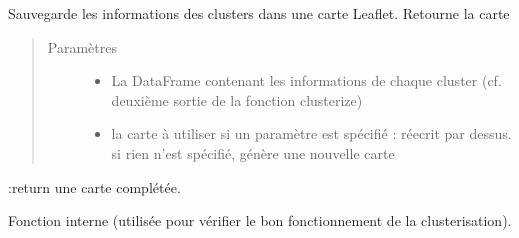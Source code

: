 \documentclass[letterpaper,10pt,french]{sphinxmanual}
\begin{document}
\begin{fulllineitems}
\label{\detokenize{index:src.clusterizer.clusterizer.save_to_map}}
\sphinxAtStartPar
Sauvegarde les informations des clusters dans une carte Leaflet.
Retourne la carte
\begin{quote}\begin{description}
\item[{Paramètres}] \leavevmode\begin{itemize}
\item {} 
\sphinxAtStartPar
{} \textendash{} La DataFrame contenant les informations de chaque cluster
(cf. deuxième sortie de la fonction clusterize)

\item {} 
\sphinxAtStartPar
{} \textendash{} la carte à utiliser
si un paramètre est spécifié : réecrit par dessus.
si rien n’est spécifié, génère une nouvelle carte

\end{itemize}

\end{description}\end{quote}

\sphinxAtStartPar
:return une carte complétée.

\end{fulllineitems}


\begin{fulllineitems}
\label{\detokenize{index:src.clusterizer.clusterizer.test_geojson}}
\sphinxAtStartPar
Fonction interne (utilisée pour vérifier le bon fonctionnement de la clusterisation).

\end{fulllineitems}

\end{document}
